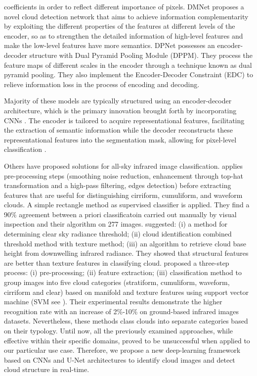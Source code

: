 \documentclass[amt, article]{copernicus}
\begin{document}
coefficients in order to reflect different importance of pixels. DMNet \citep{DMNet} proposes a novel cloud detection network that aims to achieve information complementarity by exploiting the different properties of the features at different levels of the encoder, so as to strengthen the detailed information of high-level features and make the low-level features have more semantics. DPNet \citep{DPNet} possesses an encoder-decoder structure with Dual Pyramid Pooling Module (DPPM). They process the feature maps of different scales in the encoder through a technique known as dual pyramid pooling. They also implement the Encoder-Decoder Constraint (EDC) to relieve information loss in the process of encoding and decoding.

Majority of these models are typically structured using an encoder-decoder architecture, which is the primary innovation brought forth by incorporating CNNs \citep{oshea2015introduction}. The encoder is tailored to acquire representational features, facilitating the extraction of semantic information while the decoder reconstructs these representational features into the segmentation mask, allowing for pixel-level classification \citep{badrinarayanan2017segnet, Alzubaidi2021ReviewOD}.

Others have proposed solutions for all-sky infrared image classification.
\citet{Liu2021} applies pre-processing steps (smoothing noise reduction, enhancement through top-hat transformation and a high-pass filtering, edges detection) before extracting features that are useful for distinguishing cirriform, cumuliform, and waveform clouds. A simple rectangle method as supervised classifier is applied. They find a 90\% agreement between a priori classificatoin carried out manually by visual inspection and their algorithm on 277 images. \citet{SUN2011278} suggested: (i) a method for determining clear sky radiance threshold; (ii) cloud identification combined threshold method with texture method; (iii) an algorithm to retrieve cloud base height from downwelling infrared radiance. They showed that structural features are better than texture features in classifying cloud. \citet{amt-11-5351-2018} proposed a three-step process: (i) pre-processing; (ii) feature extraction; (iii) classification method to group images into five cloud categories (stratiform, cumuliform, waveform, cirriform and clear) based on manifold and texture features using support vector machine (SVM see \citealt{cortes1995support}). Their experimental results demonstrate the higher recognition rate with an increase of 2\%-10\% on ground-based infrared images datasets. Nevertheless, these methods class clouds into separate categories based on their typology. Until now, all the previously examined approaches, while effective within their specific domains, proved to be unsuccessful when applied to our particular use case. Therefore, we propose a new deep-learning framework based on CNNs and U-Net architectures to identify cloud images and detect cloud structure in real-time.
\end{document}
